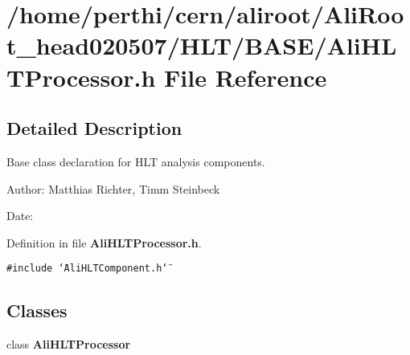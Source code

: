 \section{/home/perthi/cern/aliroot/Ali\-Root\_\-head020507/HLT/BASE/Ali\-HLTProcessor.h File Reference}
\label{AliHLTProcessor_8h}


\subsection{Detailed Description}
Base class declaration for HLT analysis components. 

\begin{Desc}
\item[Author:]Matthias Richter, Timm Steinbeck \end{Desc}
\begin{Desc}
\item[Date:]\end{Desc}


Definition in file {\bf Ali\-HLTProcessor.h}.

{\tt \#include \char`\"{}Ali\-HLTComponent.h\char`\"{}}\par
\subsection*{Classes}
\begin{CompactItemize}
\item 
class {\bf Ali\-HLTProcessor}
\end{CompactItemize}

